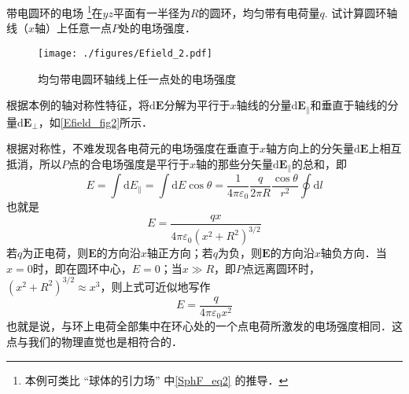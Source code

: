 \begin{example}{带电圆环的电场}\label{Efield_ex2}
\footnote{本例可类比 “球体的引力场” 中\autoref{SphF_eq2} 的推导．}在$yz$平面有一半径为$R$的圆环，均匀带有电荷量$q$. 试计算圆环轴线（$x$轴）上任意一点$P$处的电场强度．
\begin{figure}[ht]
\centering
\texttt{[image: ./figures/Efield\_2.pdf]}
\caption{均匀带电圆环轴线上任一点处的电场强度} \label{Efield_fig2}
\end{figure}

根据本例的轴对称性特征，将$\mathrm d\mathbf E$分解为平行于$x$轴线的分量$\mathrm d\mathbf E_\parallel$和垂直于轴线的分量$\mathrm d\mathbf E_\perp$，如\autoref{Efield_fig2}所示．

根据对称性，不难发现各电荷元的电场强度在垂直于$x$轴方向上的分矢量$\mathrm d\mathbf E$上相互抵消，所以$P$点的合电场强度是平行于$x$轴的那些分矢量$\mathrm d\mathbf E_\parallel$的总和，即
\begin{equation}
E=\int \mathrm{d} E_\parallel=\int \mathrm{d} E \cos \theta=\frac{1}{4 \pi \varepsilon_{0}} \frac{q}{2 \pi R} \frac{\cos \theta}{r^{2}} \oint \mathrm{d} l
\end{equation}
也就是
\begin{equation} \label{Efield_eq6}
E=\frac{q x}{4 \pi \varepsilon_{0}\left(x^{2}+R^{2}\right)^{3 / 2}} 
\end{equation}
若$q$为正电荷，则$\mathbf E$的方向沿$x$轴正方向；若$q$为负，则$\mathbf E$的方向沿$x$轴负方向．当$x=0$时，即在圆环中心，$E=0$；当$x\gg R$，即$P$点远离圆环时，$\left(x^{2}+R^{2}\right)^{3 / 2} \approx x^{3}$，则上式可近似地写作
\begin{equation}
E=\frac{q}{4 \pi \varepsilon_{0} x^{2}}
\end{equation}
也就是说，与环上电荷全部集中在环心处的一个点电荷所激发的电场强度相同．这点与我们的物理直觉也是相符合的．
\end{example}

